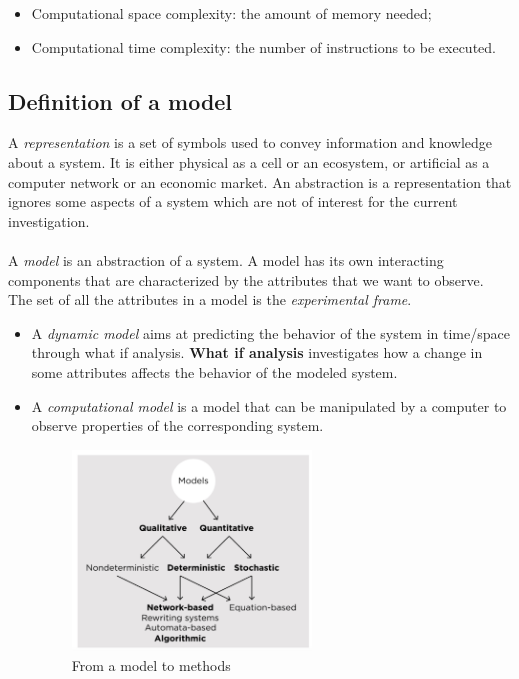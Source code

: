 \begin{itemize}
\tightlist
\item
  Computational space complexity: the amount of memory needed;
\item
  Computational time complexity: the number of instructions to be
  executed.
\end{itemize}


\subsection{Definition of a model}

A \emph{representation} is a set of symbols used to convey information
and knowledge about a system. It is either physical as a cell or an
ecosystem, or artificial as a computer network or an economic market. An
abstraction is a representation that ignores some aspects of a system
which are not of interest for the current investigation.
\\
\\
\noindent
A \emph{model} is an abstraction of a system. A model has its own interacting
components that are characterized by the attributes that we want to
observe. The set of all the attributes in a model is the
\emph{experimental frame}.

\begin{itemize}
\item
  A \emph{dynamic model} aims at predicting the behavior of the system
  in time/space through what if analysis. \textbf{What if analysis} investigates
  how a change in some attributes affects the behavior of the modeled
  system.
\item
  A \emph{computational model} is a model that can be manipulated by a
  computer to observe properties of the corresponding system.

  \begin{figure}
  \centering
  \includegraphics[width=0.6\textwidth]{scheme_model.png}
  \caption{From a model to methods}
  \end{figure}
\end{itemize}


